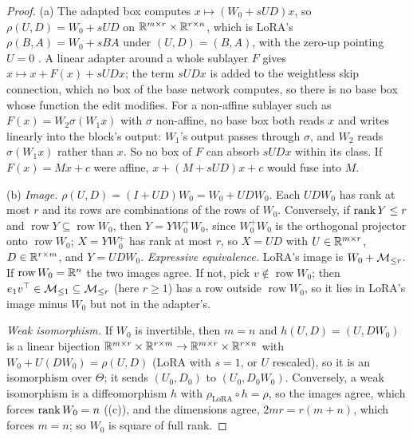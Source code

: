 \begin{proof}
(a) The adapted box computes $x\mapsto(W_0+sUD)x$, so $\rho(U,D)=W_0+sUD$ on $\mathbb{R}^{m\times r}\times\mathbb{R}^{r\times n}$, which is
LoRA's $\rho(B,A)=W_0+sBA$ under $(U,D)=(B,A)$, with the zero-up pointing $U=0$ \citep[Table~1]{he2021unified}. A linear adapter
around a whole sublayer $F$ gives $x\mapsto x+F(x)+sUDx$; the term $sUDx$ is added to the weightless skip connection, which no
box of the base network computes, so there is no base box whose function the edit modifies. For a non-affine sublayer such as
$F(x)=W_2\sigma(W_1x)$ with $\sigma$ non-affine, no base box both reads $x$ and writes linearly into the block's output: $W_1$'s
output passes through $\sigma$, and $W_2$ reads $\sigma(W_1x)$ rather than $x$. So no box of $F$ can absorb $sUDx$ within its
class. If $F(x)=Mx+c$ were affine, $x+(M+sUD)x+c$ would fuse into $M$.

(b) \emph{Image.} $\rho(U,D)=(I+UD)W_0=W_0+UDW_0$. Each $UDW_0$ has rank at most $r$ and its rows are combinations of the rows
of $W_0$. Conversely, if $\operatorname{rank} Y\le r$ and $\operatorname{row}Y\subseteq\operatorname{row}W_0$, then $Y=YW_0^+W_0$, since
$W_0^+W_0$ is the orthogonal projector onto $\operatorname{row}W_0$; $X=YW_0^+$ has rank at most $r$, so $X=UD$ with
$U\in\mathbb{R}^{m\times r}$, $D\in\mathbb{R}^{r\times m}$, and $Y=UDW_0$. \emph{Expressive equivalence.} LoRA's image is $W_0+\mathcal{M}_{\le r}$. If
$\operatorname{row}W_0=\mathbb{R}^n$ the two images agree. If not, pick $v\notin\operatorname{row}W_0$; then $e_1v^{\top}\in\mathcal{M}_{\le1}\subseteq
\mathcal{M}_{\le r}$ (here $r\ge1$) has a row outside $\operatorname{row}W_0$, so it lies in LoRA's image minus $W_0$ but not in the
adapter's.

\emph{Weak isomorphism.} If $W_0$ is invertible, then $m=n$ and $h(U,D)=(U,DW_0)$ is a linear bijection
$\mathbb{R}^{m\times r}\times\mathbb{R}^{r\times m}\to\mathbb{R}^{m\times r}\times\mathbb{R}^{r\times n}$ with $W_0+U(DW_0)=\rho(U,D)$ (LoRA with $s=1$, or $U$
rescaled), so it is an isomorphism over $\Theta$; it sends $(U_0,D_0)$ to $(U_0,D_0W_0)$. Conversely, a weak isomorphism is a
diffeomorphism $h$ with $\rho_{\mathrm{LoRA}}\circ h=\rho$, so the images agree, which forces $\operatorname{rank} W_0=n$
((c)), and the dimensions agree, $2mr=r(m+n)$, which forces $m=n$; so $W_0$ is square of full rank.


\end{proof}
